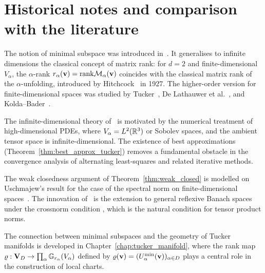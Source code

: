 \section{Historical notes and comparison with the literature}
\label{sec:min:history}

The notion of minimal subspace was introduced in~\cite{FH2012}.
It generalises to infinite dimensions the classical concept of matrix
rank: for $d=2$ and finite-dimensional $V_\alpha$, the $\alpha$-rank
$r_\alpha(\mathbf{v}) = \mathrm{rank} \mathcal{M}_{\alpha}(\mathbf{v})$ coincides with the classical
matrix rank of the $\alpha$-unfolding, introduced by
Hitchcock~\cite{Hitchcock1927} in 1927. The higher-order version for
finite-dimensional spaces was studied by Tucker~\cite{Tucker1966},
De Lathauwer et al.~\cite{DeLathauwer2000}, and Kolda--Bader~\cite{KoldaBader2009}.

The infinite-dimensional theory of~\cite{FH2012} is motivated by the
numerical treatment of high-dimensional PDEs, where $V_\alpha = L^2(\mathbb{R}^3)$
or Sobolev spaces, and the ambient tensor space is infinite-dimensional.
The existence of best approximations (Theorem~\ref{thm:best_approx_tucker})
removes a fundamental obstacle in the convergence analysis of alternating
least-squares and related iterative methods.

The weak closedness argument of Theorem~\ref{thm:weak_closed} is
modelled on Uschmajew's result for the case of the spectral norm
on finite-dimensional spaces~\cite{UschmajewVandereycken2013}. The innovation
of~\cite{FH2012} is the extension to general reflexive Banach spaces
under the crossnorm condition \condINJ, which is the natural condition
for tensor product norms.

The connection between minimal subspaces and the geometry of Tucker
manifolds is developed in Chapter~\ref{chap:tucker_manifold}, where
the rank map $\varrho: \mathbf{V}_D \to \prod_\alpha \mathbb{G}_{r_\alpha}(V_\alpha)$
defined by $\varrho(\mathbf{v}) = (U^{\min}_{\alpha}(\mathbf{v}))_{\alpha \in D}$ plays
a central role in the construction of local charts.

